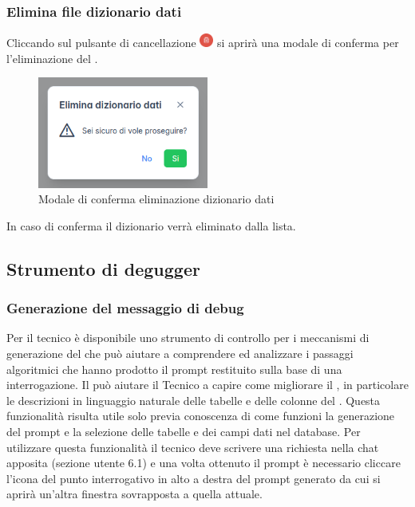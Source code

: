 \subsubsection{Elimina file dizionario dati}
Cliccando sul pulsante di cancellazione \includegraphics[height=1.2em]{assets/dd_delete_button.png} si aprirà una modale di conferma per l'eliminazione del .
\begin{figure}[H]
  \centering
  \includegraphics[width=0.5\textwidth]{assets/dd_confirm_delete.png}
  \caption{Modale di conferma eliminazione dizionario dati}
\end{figure}
In caso di conferma il dizionario verrà eliminato dalla lista.



\subsection{Strumento di degugger}

\subsubsection{Generazione del messaggio di debug}
Per il tecnico è disponibile uno strumento di controllo per i meccanismi di generazione del  che può aiutare a comprendere ed analizzare i passaggi algoritmici che hanno prodotto il prompt restituito sulla base di una interrogazione. Il  può aiutare il Tecnico a capire come migliorare il , in particolare le descrizioni in linguaggio naturale delle tabelle e delle colonne del . Questa funzionalità risulta utile solo previa conoscenza di come funzioni la generazione del prompt e la selezione delle tabelle e dei campi dati nel database.
Per utilizzare questa funzionalità il tecnico deve scrivere una richiesta nella chat apposita (sezione utente 6.1) e una volta ottenuto il prompt è necessario cliccare l'icona del punto interrogativo in alto a destra del prompt generato da cui si aprirà un'altra finestra sovrapposta a quella attuale.


